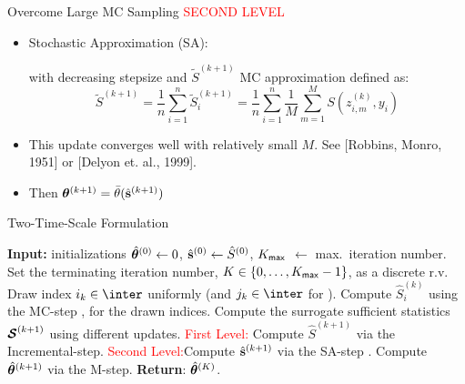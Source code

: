\documentclass[10pt]{beamer}
\begin{document}
     
\begin{frame}{Overcome Large MC Sampling}
\textcolor{red}{SECOND LEVEL}
\begin{itemize}
\item Stochastic Approximation (SA):
\begin{center}
\end{center}
with decreasing stepsize and $\tilde{S}^{(k+1)}$ MC approximation defined as:
$$
\tilde{S}^{(k+1)} = \frac{1}{n} \sum_{i=1}^n \tilde{S}^{(k+1)}_i = \frac{1}{n} \sum_{i=1}^n\frac{1}{M} \sum_{m=1}^M S(z_{i,m}^{(k)}, y_i)
$$
\item This update converges well with relatively small $M$. See [Robbins, Monro, 1951] or [Delyon et. al., 1999].
\item Then ${\bm{\theta}}^{(k+1)} = \bar{\theta}(\hat{{\mathbf{s}}}^{(k+1)})$
\end{itemize}

\end{frame}


\begin{frame}{Two-Time-Scale Formulation}

\begin{algorithm}[H]
\caption{Two-Time-Scale Noisy EM methods.}\label{alg:sem}
  \begin{algorithmic}[1]
  \STATE \textbf{Input:} initializations $\hat{{\bm{\theta}}}^{(0)} \leftarrow 0$, $\hat{{\mathbf{s}}}^{(0)} \leftarrow \hat{S}^{(0)}$, $K_{\sf max}$ $\leftarrow$ max.~iteration number. \STATE Set the terminating iteration number, $K \in \{0,\dots,K_{\sf max}-1\}$, as a discrete r.v.
  \STATE Draw index $i_k \in \inter$ uniformly (and $j_k \in \inter$ for \FISAEM).
     \STATE Compute $\hat{S}_i^{(k)}$ using the {\sf MC-step} ,  for the drawn indices.
   \STATE Compute the surrogate sufficient statistics ${\bm{\mathcal{S}}}^{(k+1)}$ using different updates.
   \STATE \textcolor{red}{First Level:} Compute $\hat{S}^{(k+1)}$ via the {\sf Incremental-step}.
      \STATE \textcolor{red}{Second Level:}Compute $\hat{{\mathbf{s}}}^{(k+1)}$ via the {\sf SA-step} .
   \STATE Compute $\hat{{\bm{\theta}}}^{(k+1)}$ via the {\sf M-step}.
\ENDFOR
\STATE \textbf{Return}: $\hat{{\bm{\theta}}}^{(K)}$.
  \end{algorithmic}
\end{algorithm}

\end{frame}
\end{document}
